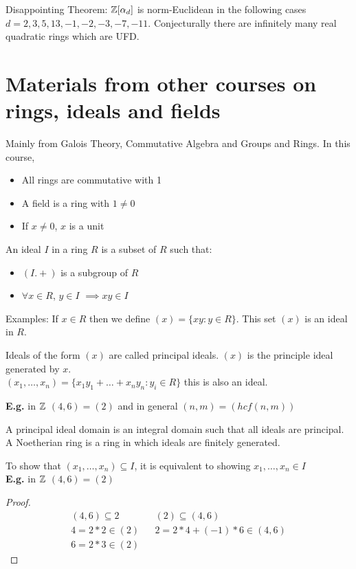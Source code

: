 \documentclass[11pt]{article}
\begin{document}
\begin{theorem}
	Disappointing Theorem: $\mathbb{Z}[\alpha_d] $ is norm-Euclidean in the following cases $d = 2,3,5,13,-1,-2,-3,-7,-11$.
	Conjecturally there are infinitely many real quadratic rings which are UFD.
\end{theorem}

\section{Materials from other courses on rings, ideals and fields}
Mainly from Galois Theory, Commutative Algebra and Groups and Rings. 
In this course, 

\begin{itemize}
	\item{All rings are commutative with 1}
	\item{A field is a ring with $1 \neq 0$}
	\item{If $x\neq 0$, $x$ is a unit }
\end{itemize}

\begin{defn}
An ideal $I$ in a ring $R$ is a subset of $R$ such that:

	\begin{itemize}
		\item{$(I.+)$ is a subgroup of $R$}
		\item{$\forall x \in R $, $y \in I$ $\implies xy \in I$}
	\end{itemize}
\end{defn}
$ $\\
Examples: If $x \in R$ then we define $(x) = \{ xy: y \in R \}$.
This set $(x)$ is an ideal in $R$.


\begin{defn}
	Ideals of the form $(x)$ are called principal ideals. 
	$(x)$ is the principle ideal generated by $x$.\\
	$(x_1, \dots, x_n) = \{x_1y_1 + \dots + x_ny_n : y_i \in R\}$ this is also an ideal.
\end{defn}
$ $\\[1em]
\textbf{E.g.} in $\mathbb{Z}$ $(4,6) = (2)$ and in general $(n,m) = (hcf(n,m))$

\begin{defn}
A principal ideal domain is an integral domain such that all ideals are principal. A Noetherian ring is a ring in which ideals are finitely generated.
\end{defn}
$ $\\[1em]
To show that $(x_1, \dots, x_n) \subseteq I$, it is equivalent to showing $x_1, \dots, x_n \in I$
$ $\\
\textbf{E.g.} in $\mathbb{Z}$ $(4,6) = (2)$
\begin{proof}
	\begin{align*}
		(4,6) \subseteq 2 && (2) \subseteq(4,6) \\
		4 = 2*2 \in (2) && 2=2*4 + (-1) *6 \in (4,6)\\
		6 = 2*3 \in (2) 
	\end{align*}
\end{proof}
\end{document}
